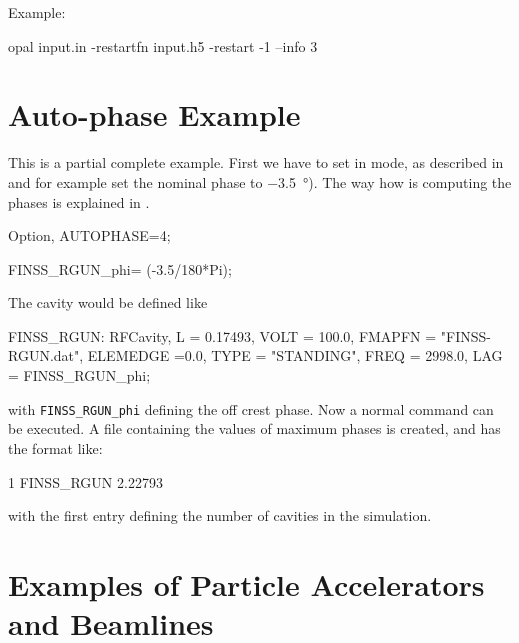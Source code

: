 \vspace{3pt}
Example:
\begin{example}
opal input.in -restartfn input.h5 -restart -1 --info 3
\end{example}


\section{Auto-phase Example}
\label{sec:trackautoph}
This is a partial complete example. First we have to set \opal in  mode, as described in  and for example set the nominal phase to
\SI{-3.5}{\degree}). The way how \opal is computing the phases is explained in .
\begin{example}
Option, AUTOPHASE=4;

FINSS_RGUN_phi= (-3.5/180*Pi);
\end{example}

The cavity would be defined like
\begin{example}
FINSS_RGUN: RFCavity, L = 0.17493, VOLT = 100.0,
	FMAPFN = "FINSS-RGUN.dat",
	ELEMEDGE =0.0, TYPE = "STANDING", FREQ = 2998.0,
	LAG = FINSS_RGUN_phi;
\end{example}
with \texttt{FINSS\_RGUN\_phi} defining the off crest phase. Now a normal  command can be executed. A file containing the values of maximum phases is created, and has the format like:
\begin{example}
1
FINSS_RGUN
2.22793
\end{example}
with the first entry defining the number of cavities in the simulation.


\section{Examples of Particle Accelerators and Beamlines}
\label{sec:examplesbeamlines}



%

